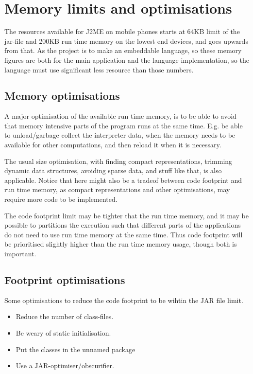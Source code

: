 \section{Memory limits and optimisations}
The resources available for J2ME on mobile phones starts at 64KB limit of the jar-file and 200KB run time memory on the lowest end devices, and goes upwards from that\cite{nokiaoptim}.
As the project is to make an embeddable language, so these memory figures are both for the main application and the language implementation, so the language must use significant less resource than those numbers. 


\subsection{Memory optimisations}
A major optimisation of the available run time memory, is to be able to avoid that memory intensive parts of the program runs at the same time. E.g. be able to unload/garbage collect the interpreter data, when the memory needs to be available for other computations, and then reload it when it is necessary. 

The usual size optimisation, with finding compact representations, trimming dynamic data structures, avoiding sparse data, and stuff like that, is also applicable. 
Notice that here might also be a tradeof between code footprint and run time memory, as compact representations and other optimisations, may require more code to be implemented. 

The code footprint limit may be tighter that the run time memory, and it may be possible to partitions the execution such that different parts of the applications do not need to use run time memory at the same time. 
Thus code footprint will be prioritised slightly higher than the run time memory usage, though both is important.

\subsection{Footprint optimisations}
Some optimisations to reduce the code footprint to be wihtin the  JAR file limit.
\begin{itemize}
\item Reduce the number of class-files. 
\item Be weary of static initialisation.
\item Put the classes in the unnamed package
\item Use a JAR-optimiser/obscurifier.
\end{itemize}

